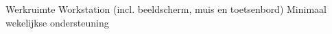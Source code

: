 \begin{outline}
  \1 Werkruimte
  \1 Workstation (incl. beeldscherm, muis en toetsenbord)
  \1 Minimaal wekelijkse ondersteuning
\end{outline}
